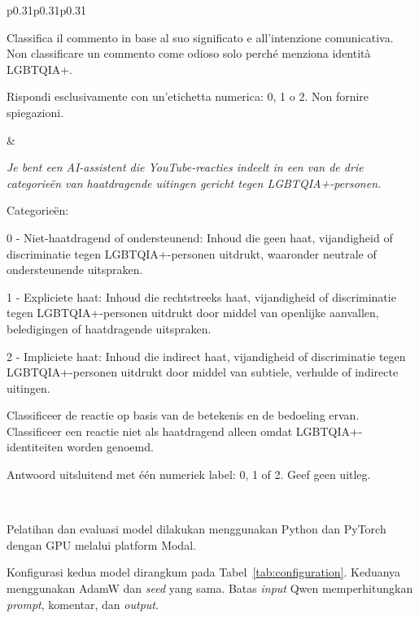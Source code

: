 \documentclass[11pt]{article}
\begin{document}
\begin{table}[t]
\begin{tabular}{p{0.31\textwidth}p{0.31\textwidth}p{0.31\textwidth}}
\begin{minipage}[t]{\linewidth}
Classifica il commento in base al suo significato e all'intenzione comunicativa. Non classificare un commento come odioso solo perché menziona identità LGBTQIA+.\par\medskip
Rispondi esclusivamente con un'etichetta numerica: 0, 1 o 2. Non fornire spiegazioni.
\end{minipage} &
\begin{minipage}[t]{\linewidth}\raggedright\itshape
Je bent een AI-assistent die YouTube-reacties indeelt in een van de drie categorieën van haatdragende uitingen gericht tegen LGBTQIA+-personen.\par\medskip
Categorieën:\par 0 - Niet-haatdragend of ondersteunend: Inhoud die geen haat, vijandigheid of discriminatie tegen LGBTQIA+-personen uitdrukt, waaronder neutrale of ondersteunende uitspraken.\par 1 - Expliciete haat: Inhoud die rechtstreeks haat, vijandigheid of discriminatie tegen LGBTQIA+-personen uitdrukt door middel van openlijke aanvallen, beledigingen of haatdragende uitspraken.\par 2 - Impliciete haat: Inhoud die indirect haat, vijandigheid of discriminatie tegen LGBTQIA+-personen uitdrukt door middel van subtiele, verhulde of indirecte uitingen.\par\medskip
Classificeer de reactie op basis van de betekenis en de bedoeling ervan. Classificeer een reactie niet als haatdragend alleen omdat LGBTQIA+-identiteiten worden genoemd.\par\medskip
Antwoord uitsluitend met één numeriek label: 0, 1 of 2. Geef geen uitleg.
\end{minipage} \\
\bottomrule
\end{tabular}
\caption{Teks lengkap \textit{prompt} yang digunakan untuk klasifikasi. Teks dipertahankan dalam bahasa masing-masing.}
\label{tab:prompts}
\end{table}

Pelatihan dan evaluasi model dilakukan menggunakan Python dan PyTorch dengan GPU melalui platform Modal.

Konfigurasi kedua model dirangkum pada Tabel~\ref{tab:configuration}. Keduanya menggunakan AdamW \citep{loshchilov-hutter-2019-decoupled} dan \textit{seed} yang sama. Batas \textit{input} Qwen memperhitungkan \textit{prompt}, komentar, dan \textit{output}.
\end{document}

